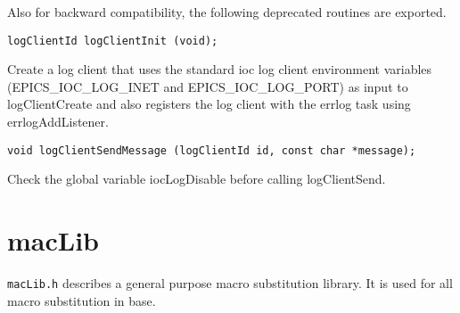 Also for backward compatibility, the following deprecated routines are exported.

\begin{verbatim}
logClientId logClientInit (void);
\end{verbatim}

Create a log client that uses the standard ioc log client environment variables (EPICS\_IOC\_LOG\_INET and EPICS\_IOC\_LOG\_PORT) as input to logClientCreate and also registers the log client with the errlog task using errlogAddListener.

\begin{verbatim}
void logClientSendMessage (logClientId id, const char *message);
\end{verbatim}

Check the global variable iocLogDisable before calling logClientSend.

\section{macLib}

\verb|macLib.h| describes a general purpose macro substitution library.
It is used for all macro substitution in base.


